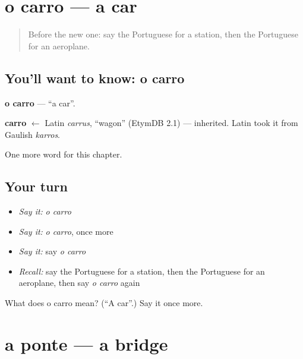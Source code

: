 \section[o carro]{o carro — a car}

\label{lesson:PT-C74-carro}



\begin{quote}
Before the new one: say the Portuguese for a station, then the Portuguese for an aeroplane.
\end{quote}

\subsection*{You'll want to know: o carro}
\textbf{o carro} — \textquotedblleft{}a car\textquotedblright{}.

\begin{cousinweb}
\textbf{carro} $\leftarrow$ Latin \emph{carrus}, \textquotedblleft{}wagon\textquotedblright{} (EtymDB 2.1) — inherited. Latin took it from Gaulish \emph{karros}.
\end{cousinweb}

\begin{grammarlens}[title={What you've built}]
One more word for this chapter.
\end{grammarlens}

\subsection*{Your turn}
\begin{itemize}
\raggedright
  \item \emph{Say it:} \emph{o carro}
  \item \emph{Say it:} \emph{o carro}, once more
  \item \emph{Say it:} say \emph{o carro}
  \item \emph{Recall:} say the Portuguese for a station, then the Portuguese for an aeroplane, then say \emph{o carro} again
\end{itemize}

\begin{tcolorbox}[breakable,colback=teal!4,colframe=teal!35!black,title={Before you move on}]
What does o carro mean? (\textquotedblleft{}A car\textquotedblright{}.) Say it once more.
\end{tcolorbox}
\section[a ponte]{a ponte — a bridge}


